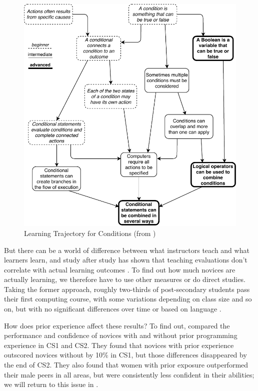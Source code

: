 \begin{figure}
\centering
\includegraphics{../docs/fig/conditionals.pdf}
\caption{Learning Trajectory for Conditions (from \cite{Rich2017})}
\label{f:pck-trajectory}
\end{figure}

But there can be a world of difference between what instructors teach
and what learners learn, and study after study has shown that teaching
evaluations don't correlate with actual learning outcomes
\cite{Star2014,Uttl2017}.  To find out how much novices are actually
learning, we therefore have to use other measures or do direct
studies.  Taking the former approach, roughly two-thirds of
post-secondary students pass their first computing course, with some
variations depending on class size and so on, but with no significant
differences over time or based on language \cite{Benn2007a,Wats2014}.

How does prior experience affect these results?  To find out,
\cite{Wilc2018} compared the performance and confidence of novices
with and without prior programming experience in CS1 and CS2.  They
found that novices with prior experience outscored novices without by
10\% in CS1, but those differences disappeared by the end of CS2.
They also found that women with prior exposure outperformed their male
peers in all areas, but were consistently less confident in their
abilities; we will return to this issue in
.

